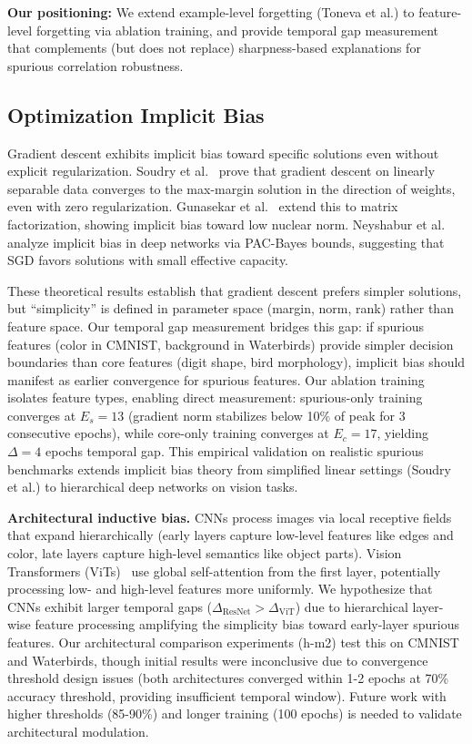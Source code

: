 \textbf{Our positioning:} We extend example-level forgetting (Toneva et al.) to feature-level forgetting via ablation training, and provide temporal gap measurement that complements (but does not replace) sharpness-based explanations for spurious correlation robustness.

\subsection{Optimization Implicit Bias}

Gradient descent exhibits implicit bias toward specific solutions even without explicit regularization. Soudry et al.~\cite{soudry2018implicit} prove that gradient descent on linearly separable data converges to the max-margin solution in the direction of weights, even with zero regularization. Gunasekar et al.~\cite{gunasekar2018implicit} extend this to matrix factorization, showing implicit bias toward low nuclear norm. Neyshabur et al.~\cite{neyshabur2015path} analyze implicit bias in deep networks via PAC-Bayes bounds, suggesting that SGD favors solutions with small effective capacity.

These theoretical results establish that gradient descent prefers simpler solutions, but ``simplicity'' is defined in parameter space (margin, norm, rank) rather than feature space. Our temporal gap measurement bridges this gap: if spurious features (color in CMNIST, background in Waterbirds) provide simpler decision boundaries than core features (digit shape, bird morphology), implicit bias should manifest as earlier convergence for spurious features. Our ablation training isolates feature types, enabling direct measurement: spurious-only training converges at $E_s=13$ (gradient norm stabilizes below 10\% of peak for 3 consecutive epochs), while core-only training converges at $E_c=17$, yielding $\Delta=4$ epochs temporal gap. This empirical validation on realistic spurious benchmarks extends implicit bias theory from simplified linear settings (Soudry et al.) to hierarchical deep networks on vision tasks.

\textbf{Architectural inductive bias.} CNNs process images via local receptive fields that expand hierarchically (early layers capture low-level features like edges and color, late layers capture high-level semantics like object parts). Vision Transformers (ViTs)~\cite{dosovitskiy2021image} use global self-attention from the first layer, potentially processing low- and high-level features more uniformly. We hypothesize that CNNs exhibit larger temporal gaps ($\Delta_{\text{ResNet}} > \Delta_{\text{ViT}}$) due to hierarchical layer-wise feature processing amplifying the simplicity bias toward early-layer spurious features. Our architectural comparison experiments (h-m2) test this on CMNIST and Waterbirds, though initial results were inconclusive due to convergence threshold design issues (both architectures converged within 1-2 epochs at 70\% accuracy threshold, providing insufficient temporal window). Future work with higher thresholds (85-90\%) and longer training (100 epochs) is needed to validate architectural modulation.

